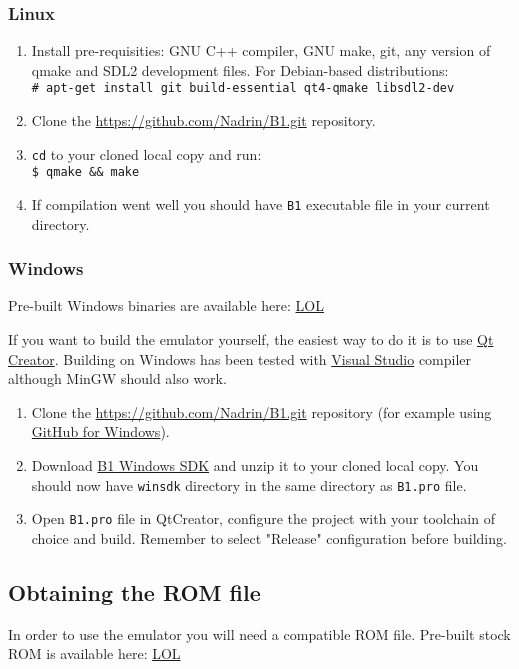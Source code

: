 \documentclass[a4paper,10pt,oneside]{article}
\begin{document}
\subsubsection*{Linux}
\begin{enumerate}
  \item Install pre-requisities: GNU C++ compiler, GNU make, git, any version of qmake and SDL2 development files. For Debian-based distributions: \\ \texttt{\# apt-get install git build-essential qt4-qmake libsdl2-dev}
  \item Clone the \url{https://github.com/Nadrin/B1.git} repository.
  \item \texttt{cd} to your cloned local copy and run: \\ \texttt{\$ qmake \&\& make}
  \item If compilation went well you should have \texttt{B1} executable file in your current directory.
\end{enumerate}

\subsubsection*{Windows}
Pre-built Windows binaries are available here: \url{LOL}

If you want to build the emulator yourself, the easiest way to do it is to use \href{http://www.qt.io/download-open-source/}{Qt Creator}. Building on Windows has been tested with \href{http://www.visualstudio.com/en-us/products/visual-studio-community-vs.aspx}{Visual Studio} compiler although MinGW should also work.

\begin{enumerate}
  \item Clone the \url{https://github.com/Nadrin/B1.git} repository (for example using \href{https://windows.github.com/}{GitHub for Windows}).
  \item Download \href{LOL}{B1 Windows SDK} and unzip it to your cloned local copy. You should now have \texttt{winsdk} directory in the same directory as \texttt{B1.pro} file.
  \item Open \texttt{B1.pro} file in QtCreator, configure the project with your toolchain of choice and build. Remember to select "Release" configuration before building.
\end{enumerate}

\subsection{Obtaining the ROM file}
\label{sec:rom}
In order to use the emulator you will need a compatible ROM file. Pre-built stock ROM is available here: \url{LOL}
\end{document}
